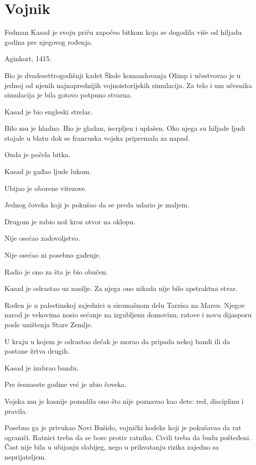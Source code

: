 \chapter{Vojnik}


Fedman Kasad je svoju priču započeo bitkom koja se dogodila više od hiljadu godina pre njegovog rođenja.

Aginkort, 1415.

Bio je dvadesettrogodišnji kadet Škole komandovanja Olimp i učestvovao je u jednoj od njenih najnaprednijih vojnoistorijskih simulacija. Za telo i um učesnika simulacija je bila gotovo potpuno stvarna.

Kasad je bio engleski strelac.

Bilo mu je hladno. Bio je gladan, iscrpljen i uplašen. Oko njega su hiljade ljudi stajale u blatu dok se francuska vojska pripremala za napad.

Onda je počela bitka.

Kasad je gađao ljude lukom.

Ubijao je oborene vitezove.

Jednog čoveka koji je pokušao da se preda udario je maljem.

Drugom je zabio nož kroz otvor na oklopu.

Nije osećao zadovoljstvo.

Nije osećao ni posebno gađenje.

Radio je ono za šta je bio obučen.

Kasad je odrastao uz nasilje. Za njega ono nikada nije bilo apstraktna stvar.

Rođen je u palestinskoj zajednici u siromašnom delu Tarzisa na Marsu. Njegov narod je vekovima nosio sećanje na izgubljenu domovinu, ratove i novu dijasporu posle uništenja Stare Zemlje.

U kraju u kojem je odrastao dečak je morao da pripada nekoj bandi ili da postane žrtva drugih.

Kasad je izabrao bandu.

Pre šesnaeste godine već je ubio čoveka.

Vojska mu je kasnije ponudila ono što nije poznavao kao dete: red, disciplinu i pravila.

Posebno ga je privukao Novi Bušido, vojnički kodeks koji je pokušavao da rat ograniči. Ratnici treba da se bore protiv ratnika. Civili treba da budu pošteđeni. Čast nije bila u ubijanju slabijeg, nego u prihvatanju rizika zajedno sa neprijateljem.


